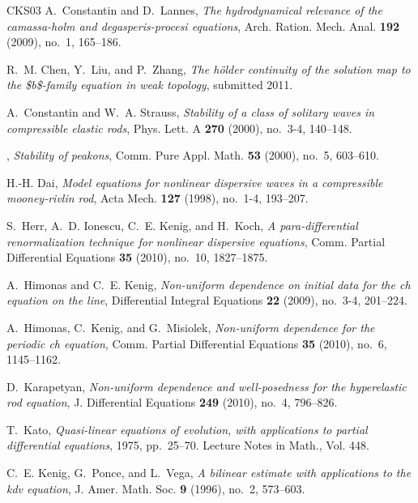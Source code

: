 \documentclass[12pt,reqno]{amsart}
\numberwithin{equation}{section}  %
\numberwithin{figure}{section}
\begin{document}
\begin{thebibliography}{CKS{\etalchar{+}}03}
A.~Constantin and D.~Lannes, \emph{The hydrodynamical relevance of the
camassa-holm and degasperis-procesi equations}, Arch. Ration. Mech. Anal.
\textbf{192} (2009), no.~1, 165--186.

 R.~M. Chen, Y.~Liu, and P.~Zhang, \emph{The
h{\"o}lder continuity of the solution map to the {\$}b{\$}-family equation
in weak topology}, submitted 2011.

A.~Constantin and W.~A. Strauss, \emph{Stability of a class of solitary waves
in compressible elastic rods}, Phys. Lett. A \textbf{270} (2000), no.~3-4,
140--148.

\bysame, \emph{Stability of peakons}, Comm. Pure Appl. Math. \textbf{53}
(2000), no.~5, 603--610.

H.-H. Dai, \emph{Model equations for nonlinear dispersive waves in a
compressible mooney-rivlin rod}, Acta Mech. \textbf{127} (1998), no.~1-4,
193--207.

S.~Herr, A.~D. Ionescu, C.~E. Kenig, and H.~Koch, \emph{A para-differential
renormalization technique for nonlinear dispersive equations}, Comm. Partial
Differential Equations \textbf{35} (2010), no.~10, 1827--1875.

A.~Himonas and C.~E. Kenig, \emph{Non-uniform dependence on initial data for
the ch equation on the line}, Differential Integral Equations \textbf{22}
(2009), no.~3-4, 201--224.

A.~Himonas, C.~Kenig, and G.~Misiolek, \emph{Non-uniform dependence for
the periodic ch equation}, Comm. Partial Differential Equations \textbf{35}
(2010), no.~6, 1145--1162.

D.~Karapetyan, \emph{Non-uniform dependence and well-posedness for the
hyperelastic rod equation}, J. Differential Equations \textbf{249} (2010),
no.~4, 796--826.

T.~Kato, \emph{Quasi-linear equations of evolution, with applications to
partial differential equations}, 1975, pp.~25--70. Lecture Notes in Math.,
Vol. 448.

C.~E. Kenig, G.~Ponce, and L.~Vega, \emph{A bilinear estimate with applications
to the kdv equation}, J. Amer. Math. Soc. \textbf{9} (1996), no.~2, 573--603.


\end{thebibliography}
\end{document}
